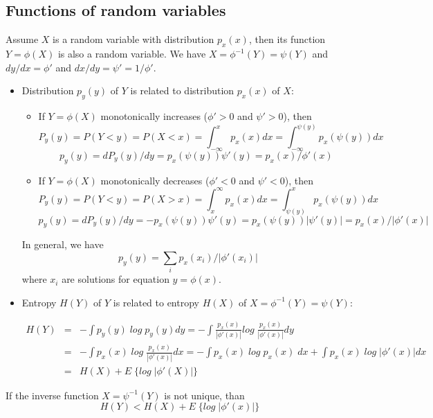 \documentclass[12pt, a4paper, onecolumn]{IEEEtran}
\begin{document}
\subsection*{Functions of random variables}

Assume $X$ is a random variable with distribution $p_x(x)$, then its function
$Y=\phi(X)$ is also a random variable. We have $X=\phi^{-1}(Y)=\psi(Y)$
and $dy/dx=\phi'$ and $dx/dy=\psi'=1/\phi'$.

\begin{itemize}
\item Distribution $p_y(y)$ of $Y$ is related to distribution $p_x(x)$ of $X$:

\begin{itemize}
\item If $Y=\phi(X)$ monotonically increases ($\phi'>0$ and $\psi'>0$), then
\[ P_y(y)=P(Y<y)=P(X<x)=\int_{-\infty}^x p_x(x)dx
	=\int_{-\infty}^{\psi(y)} p_x(\psi(y))dx	\]
\[ p_y(y)=dP_y(y)/dy=p_x(\psi(y))\psi'(y)=p_x(x)/\phi'(x)	\]
\item If $Y=\phi(X)$ monotonically decreases ($\phi'<0$ and $\psi'<0$), then
\[ P_y(y)=P(Y<y)=P(X>x)=\int_x^{\infty} p_x(x)dx
	=\int_{\psi(y)}^x p_x(\psi(y))dx	\]
\[ p_y(y)=dP_y(y)/dy=-p_x(\psi(y))\psi'(y)=p_x(\psi(y))|\psi'(y)|=p_x(x)/|\phi'(x)| \]
\end{itemize}
In general, we have
\[	p_y(y)=\sum_i p_x(x_i)/|\phi'(x_i)| \]
where $x_i$ are solutions for equation $y=\phi(x)$.

\item Entropy $H(Y)$ of $Y$ is related to entropy $H(X)$ of
$X=\phi^{-1}(Y)=\psi(Y)$:

\begin{eqnarray}
 H(Y) &=& -\int p_y(y) \; log \; p_y(y) dy
	=-\int \frac{p_x(x)}{|\phi'(x)|} log \; \frac{p_x(x)}{|\phi'(x)|} dy
	\nonumber \\
	&=&-\int p_x(x) \; log \; \frac{p_x(x)}{|\phi'(x)|} dx
	=-\int p_x(x) \; log \; p_x(x) \; dx+\int p_x(x)\; log \; |\phi'(x)| dx
	\nonumber \\
	&=&H(X)+E\; \{log\;|\phi'(X)|\}
	\nonumber	\end{eqnarray}

\end{itemize}
If the inverse function $X=\psi^{-1}(Y)$ is not unique, than
\[	H(Y)<H(X)+E\; \{log\;|\phi'(x)|\}	\]
\end{document}
